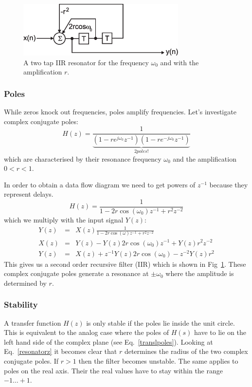 \documentclass[12pt,a4paper]{article}
\begin{document}
\begin{figure}[!hbt]
\begin{center}
\mbox{\includegraphics[width=0.75\textwidth]{iir_stop}}
\end{center}
\caption{A two tap IIR resonator for the frequency $\omega_0$ and with
the amplification $r$.
\label{iir_stop}}
\end{figure}

\subsubsection{Poles}
While zeros knock out frequencies, poles amplify frequencies.
Let's investigate complex conjugate poles:
\begin{equation}
H(z) = \frac{1}{\underbrace{(1 - r e^{j \omega_{0}} z^{-1})(1 - r e^{-j \omega_{0}} z^{-1})}_{2 poles!}} 
\label{resonatorz}
\end{equation}
which are characterised by their resonance frequency $\omega_0$
and the amplification $0<r<1$.

In order to obtain a data flow diagram we need to get powers of $z^{-1}$
because they represent delays.
\begin{equation}
H(z) = \frac{1}{1 - 2 r \cos(\omega_{0}) z^{-1} + r^{2} z^{-2}} 
\end{equation}
which we multiply with the input signal $Y(z)$:
\begin{eqnarray} 
Y(z) & = & X(z) \frac{1}{1 - 2 r \cos (\omega) z^{-1} + r^{2} z^{-2}} \\
X(z) & = & Y(z) - Y(z) 2r \cos (\omega_{0}) z^{-1} + Y(z) r^{2} z^{-2} \\
Y(z) & = & X(z) + z^{-1} Y(z) 2r \cos (\omega_{0}) - z^{-2} Y(z) r^{2}
\end{eqnarray}
This gives us a second order recursive filter (IIR) which is
shown in Fig~\ref{iir_stop}. These complex
conjugate poles generate a resonance at $\pm\omega_0$ where the
amplitude is determined by $r$.

\subsubsection{Stability}
A transfer function $H(z)$ is only stable if the poles lie inside the
unit circle. This is equivalent to the analog case where the poles of
$H(s)$ have to lie on the left hand side of the complex plane (see
Eq.~\ref{translpoles}). Looking at Eq.~\ref{resonatorz} it becomes
clear that $r$ determines the radius of the two complex conjugate poles. If
$r>1$ then the filter becomes unstable. The same applies to poles on
the real axis. Their the real values have to stay within the range $-1
\ldots +1$.
\end{document}
